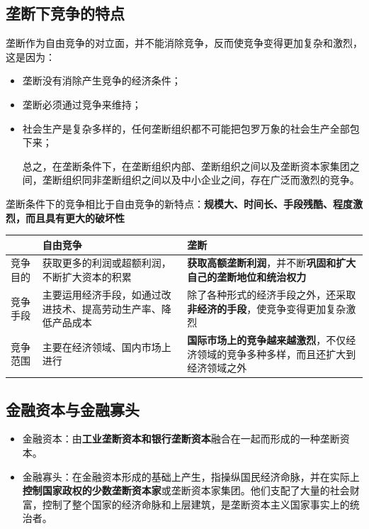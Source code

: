 \documentclass[12pt,openany]{ctexbook}
\begin{document}
\subsection{垄断下竞争的特点}
垄断作为自由竞争的对立面，并不能消除竞争，反而使竞争变得更加复杂和激烈，这是因为：
\begin{itemize}
  \item 垄断没有消除产生竞争的经济条件；
  \item 垄断必须通过竞争来维持；
  \item 社会生产是复杂多样的，任何垄断组织都不可能把包罗万象的社会生产全部包下来；
  \par 总之，在垄断条件下，在垄断组织内部、垄断组织之间以及垄断资本家集团之间，垄断组织同非垄断组织之间以及中小企业之间，存在广泛而激烈的竞争。
\end{itemize}
垄断条件下的竞争相比于自由竞争的新特点：\textbf{规模大、时间长、手段残酷、程度激烈，而且具有更大的破坏性}
\begin{center}
\begin{tabularx}{\linewidth}{lXX}
\toprule
 & \textbf{自由竞争} & \textbf{垄断} \\
\midrule
竞争目的 & 获取更多的利润或超额利润，不断扩大资本的积累 & \textbf{获取高额垄断利润}，并不断\textbf{巩固和扩大自己的垄断地位和统治权力} \\
竞争手段 & 主要运用经济手段，如通过改进技术、提高劳动生产率、降低产品成本 & 除了各种形式的经济手段之外，还采取\textbf{非经济的手段}，使竞争变得更加复杂激烈 \\
竞争范围 & 主要在经济领域、国内市场上进行 & \textbf{国际市场上的竞争越来越激烈}，不仅经济领域的竞争多种多样，而且还扩大到经济领域之外 \\
\bottomrule
\end{tabularx}
\end{center}
\subsection{金融资本与金融寡头}
\begin{itemize}
  \item 金融资本：由\textbf{工业垄断资本和银行垄断资本}融合在一起而形成的一种垄断资本。
  \item 金融寡头：在金融资本形成的基础上产生，指操纵国民经济命脉，并在实际上\textbf{控制国家政权的少数垄断资本家}或垄断资本家集团。他们支配了大量的社会财富，控制了整个国家的经济命脉和上层建筑，是垄断资本主义国家事实上的统治者。
\end{itemize}
\end{document}
